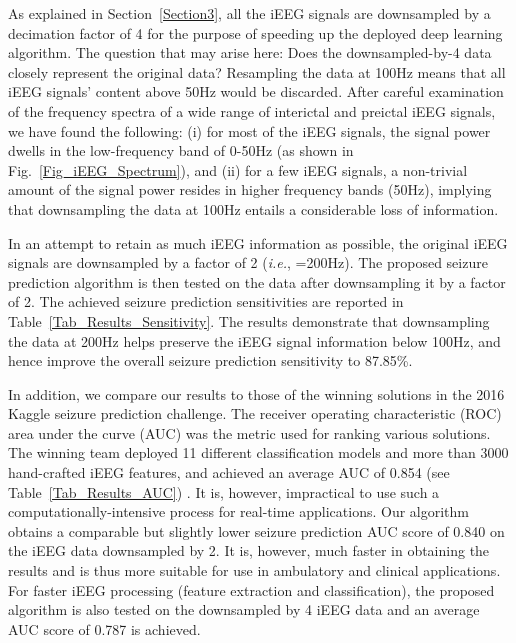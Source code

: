 \documentclass[journal]{IEEEtran}
\begin{document}
As explained in Section~\ref{Section3}, all the iEEG signals are downsampled by a decimation factor of 4 for the purpose of speeding up the deployed deep learning algorithm. The question that may arise here: Does the downsampled-by-4 data closely represent the original data? 
Resampling the data at 100Hz means that all iEEG signals' content above 50Hz would be discarded. After careful examination of the frequency spectra of a wide range of interictal and preictal iEEG signals, we have found the following: (i) for most of the iEEG signals, the signal power dwells in the low-frequency band of 0-50Hz (as shown in Fig.~\ref{Fig_iEEG_Spectrum}), and (ii) for a few iEEG signals, a non-trivial amount of the signal power resides in higher frequency bands (50Hz), implying that downsampling the data at 100Hz entails a considerable loss of information.  

In an attempt to retain as much iEEG information as possible, the original iEEG signals are downsampled by a factor of 2 (\textit{i.e.}, =200Hz). The proposed seizure prediction algorithm is then tested on the data after downsampling it by a factor of 2. The achieved seizure prediction sensitivities are reported in Table~\ref{Tab_Results_Sensitivity}. The results demonstrate that downsampling the data at 200Hz helps preserve the iEEG signal information below 100Hz, and hence improve the overall seizure prediction sensitivity to 87.85\%.   





In addition, we compare our results to those of the winning solutions in the 2016 Kaggle seizure prediction challenge. The receiver operating characteristic (ROC) area under the curve (AUC) was the metric used for ranking various solutions. The winning team deployed 11 different classification models and more than 3000 hand-crafted iEEG features, and achieved an average AUC of 0.854 (see Table~\ref{Tab_Results_AUC}) \cite{WinningSolution, kuhlmann2018epilepsyecosystem}. It is, however, impractical to use such a computationally-intensive process for real-time applications. Our algorithm obtains a comparable but slightly lower seizure prediction AUC score of 0.840 on the iEEG data downsampled by 2. It is, however, much faster in obtaining the results and is thus more suitable for use in ambulatory and clinical applications. 
For faster iEEG processing (feature extraction and classification), the proposed algorithm is also tested on the downsampled by 4 iEEG data and an average AUC score of 0.787 is achieved. 
\end{document}
